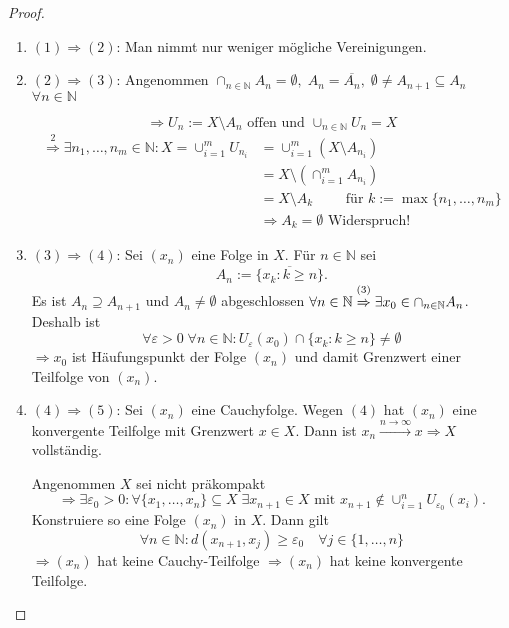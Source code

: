 \documentclass[ngerman]{report}
\theoremstyle{plain}%
\theoremstyle{definition}%
\theoremstyle{myStyle}
\newcommand{\N}{\mathbb{N}}
\newcommand{\df}[1][]{%
	\overset{#1}{\Rightarrow}
}
\begin{document}
\begin{proof}
\begin{enumerate}[]
	\item $(1) \df (2)$: Man nimmt nur weniger mögliche Vereinigungen.
	
	\item $(2) \df (3)$: 
		Angenommen $\cap_{n\in\N}{A_n} = \emptyset,\;A_n = \overline{A_n},\;\emptyset \not = A_{n+1} \subseteq A_n$ $\forall n\in\N$\par
			$$\df U_n := X\setminus A_n \text{ offen und }\cup_{n\in\N} U_n = X$$
			\begin{equation*}
			\begin{split}
				\df[2] \exists n_1,\dots,n_m\in\N : X = \cup^m_{i=1} U_{n_i} & = \cup^m_{i=1} (X\setminus A_{n_i}) 
				\\ & = X \setminus (\cap^m_{i=1} A_{n_i})
				\\ & = X \setminus A_k\qquad \text{ für } k := \max \{n_1,\dots,n_m\}
				\\ & \df A_k = \emptyset \text{ Widerspruch!}
			\end{split}
			\end{equation*}
	
	\item $(3) \df (4)$:
		Sei $(x_n)$ eine Folge in  $X$. Für $n\in\N$ sei $$A_n:=\overline{\{x_k : k \geq n\}}.$$ 
		Es ist $A_n \supseteq A_{n+1}$ und $A_n \not= \emptyset$ abgeschlossen $\forall n\in\N \overset{(3)}{\df} \exists x_0 \in \cap_{n\in\N} A_n$. 
		Deshalb ist 
			$$\forall \varepsilon > 0 \;\forall n\in\N:U_\varepsilon (x_0) \cap \{x_k : k \geq n \} \not = \emptyset$$ 
		$\df x_0$ ist Häufungspunkt der Folge $(x_n)$ und damit Grenzwert einer Teilfolge von $(x_n)$.

	\item $(4) \df (5)$: 
		Sei $(x_n)$ eine Cauchyfolge. Wegen $(4)$ hat $(x_n)$ eine konvergente Teilfolge mit Grenzwert $x\in X$. 
		Dann ist $x_n\overset{n\to\infty}{\longrightarrow} x \df X$ vollständig.\par 
		Angenommen $X$ sei nicht präkompakt 
		$$\Rightarrow \exists 
			\varepsilon_0 > 0 : \forall\{x_1,\dots,x_n\}\subseteq X \;\exists x_{n+1} 
			\in X \text{ mit }x_{n+1} \not \in \cup^n_{i=1} U_{\varepsilon_0}(x_i).$$
		Konstruiere so eine Folge $(x_n)$ in $X$. Dann gilt 
		$$\forall n\in\N: d(x_{n+1},x_j) \geq \varepsilon_0\quad \forall j \in \{1,\dots,n\}$$
		$\df (x_n)$ hat keine Cauchy-Teilfolge $\df (x_n)$ hat keine konvergente Teilfolge.


\end{enumerate}
\end{proof}
\end{document}
